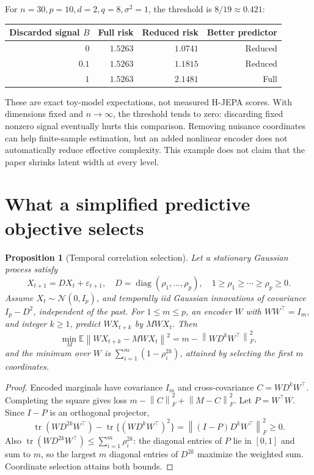 \documentclass[11pt]{article}
\newtheorem{proposition}[theorem]{Proposition}
\newcommand{\E}{\mathbb{E}}
\newcommand{\tr}{\operatorname{tr}}
\newcommand{\norm}[1]{\left\lVert #1\right\rVert}
\begin{document}
For $n=30,p=10,d=2,q=8,\sigma^2=1$, the threshold is $8/19\approx0.421$:
\begin{center}
\begin{tabular}{rrrr}
\toprule
Discarded signal $B$ & Full risk & Reduced risk & Better predictor\\
\midrule
$0$ & $1.5263$ & $1.0741$ & Reduced\\
$0.1$ & $1.5263$ & $1.1815$ & Reduced\\
$1$ & $1.5263$ & $2.1481$ & Full\\
\bottomrule
\end{tabular}
\end{center}
These are exact toy-model expectations, not measured H-JEPA scores. With dimensions fixed and $n\to\infty$, the threshold tends to zero: discarding fixed nonzero signal eventually hurts this comparison. Removing nuisance coordinates can help finite-sample estimation, but an added nonlinear encoder does not automatically reduce effective complexity. This example does not claim that the paper shrinks latent width at every level.

\section{What a simplified predictive objective selects}
\begin{proposition}[Temporal correlation selection]
\label{prop:ar}
Let a stationary Gaussian process satisfy
\[
 X_{t+1}=D X_t+\varepsilon_{t+1},\quad
 D=\operatorname{diag}(\rho_1,\ldots,\rho_p),\quad
 1\geq\rho_1\geq\cdots\geq\rho_p\geq0 .
\]
Assume $X_t\sim\mathcal N(0,I_p)$, and temporally iid Gaussian innovations of covariance $I_p-D^2$, independent of the past. For $1\leq m\leq p$, an encoder $W$ with $WW^\top=I_m$, and integer $k\geq1$, predict $WX_{t+k}$ by $MWX_t$. Then
\[
 \min_M\E\norm{WX_{t+k}-MWX_t}^2
 =m-\norm{WD^kW^\top}_F^2,
\]
and the minimum over $W$ is $\sum_{i=1}^{m}(1-\rho_i^{2k})$, attained by selecting the first $m$ coordinates.
\end{proposition}
\begin{proof}
Encoded marginals have covariance $I_m$ and cross-covariance $C=WD^kW^\top$. Completing the square gives loss
$m-\norm C_F^2+\norm{M-C}_F^2$.
Let $P=W^\top W$. Since $I-P$ is an orthogonal projector,
\[
 \tr(WD^{2k}W^\top)-\tr\{(WD^kW^\top)^2\}
 =\norm{(I-P)D^kW^\top}_F^2\geq0.
\]
Also $\tr(WD^{2k}W^\top)\leq\sum_{i=1}^m\rho_i^{2k}$: the diagonal entries of $P$ lie in $[0,1]$ and sum to $m$, so the largest $m$ diagonal entries of $D^{2k}$ maximize the weighted sum. Coordinate selection attains both bounds.
\end{proof}
\end{document}
